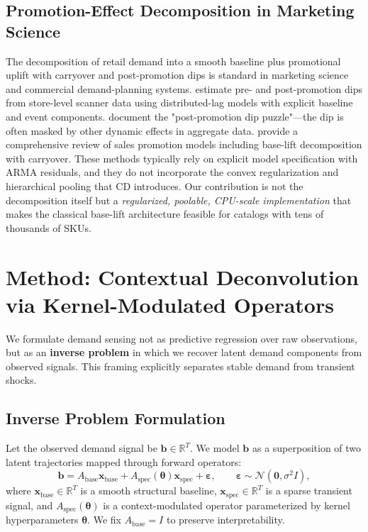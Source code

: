 \documentclass[10pt]{article} %
\theoremstyle{plain}
\theoremstyle{definition}
\newcommand{\R}{\mathbb{R}}
\newcommand{\xbase}{\mathbf{x}_{\text{base}}}
\newcommand{\xspec}{\mathbf{x}_{\text{spec}}}
\newcommand{\Abase}{A_{\text{base}}}
\newcommand{\Aspec}{A_{\text{spec}}}
\newcommand{\bvec}{\mathbf{b}}
\begin{document}
\subsection{Promotion-Effect Decomposition in Marketing Science}

The decomposition of retail demand into a smooth baseline plus promotional uplift with carryover and post-promotion dips is standard in marketing science and commercial demand-planning systems. \citet{vanheererde2000estimation} estimate pre- and post-promotion dips from store-level scanner data using distributed-lag models with explicit baseline and event components. \citet{hendel2006postpromotiondip} document the "post-promotion dip puzzle"---the dip is often masked by other dynamic effects in aggregate data. \citet{neslin2008salespromotion} provide a comprehensive review of sales promotion models including base-lift decomposition with carryover. These methods typically rely on explicit model specification with ARMA residuals, and they do not incorporate the convex regularization and hierarchical pooling that CD introduces. Our contribution is not the decomposition itself but a \emph{regularized, poolable, CPU-scale implementation} that makes the classical base-lift architecture feasible for catalogs with tens of thousands of SKUs.


\section{Method: Contextual Deconvolution via Kernel-Modulated Operators}
\label{sec:method}

We formulate demand sensing not as predictive regression over raw observations, but as an \textbf{inverse problem} in which we recover latent demand components from observed signals. This framing explicitly separates stable demand from transient shocks.

\subsection{Inverse Problem Formulation}

Let the observed demand signal be $\bvec \in \R^{T}$. We model $\bvec$ as a superposition of two latent trajectories mapped through forward operators:
\begin{equation}
\bvec = \Abase \xbase + \Aspec(\boldsymbol{\theta}) \xspec + \boldsymbol{\varepsilon}, \qquad \boldsymbol{\varepsilon} \sim \mathcal{N}(\mathbf{0}, \sigma^{2}I),
\label{eq:forward_model}
\end{equation}
where $\xbase \in \R^{T}$ is a smooth structural baseline, $\xspec \in \R^{T}$ is a sparse transient signal, and $\Aspec(\boldsymbol{\theta})$ is a context-modulated operator parameterized by kernel hyperparameters $\boldsymbol{\theta}$. We fix $\Abase = I$ to preserve interpretability.
\end{document}
